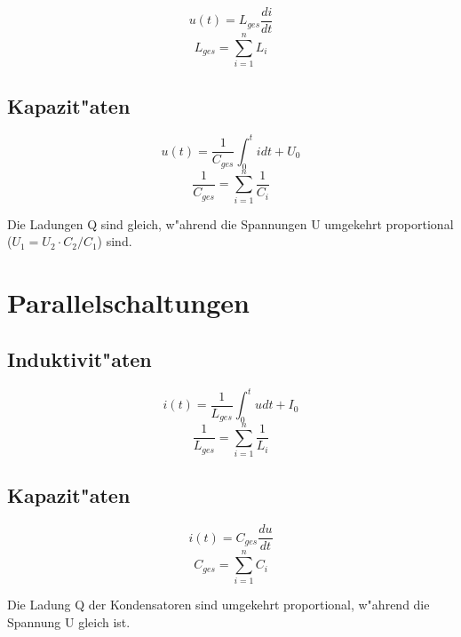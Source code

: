 \documentclass[german, 10pt, a4paper, headsepline]{scrreprt}
\theoremstyle{remark}
\begin{document}
\begin{displaymath}
	u(t)=L_{ges}\frac{di}{dt}
\end{displaymath}
\begin{displaymath}
	L_{ges}=\sum^n_{i=1}L_i
\end{displaymath}

\subsection{Kapazit"aten}

\begin{displaymath}
	u(t)=\frac{1}{C_{ges}}\int^t_0 idt + U_0
\end{displaymath}
\begin{displaymath}
	\frac{1}{C_{ges}}=\sum^n_{i=1}\frac{1}{C_i}
\end{displaymath}

Die Ladungen Q sind gleich, w"ahrend die Spannungen U umgekehrt proportional ($U_1 = U_2 \cdotp C_2/C_1$) sind.

\section{Parallelschaltungen}

\subsection{Induktivit"aten}

\begin{displaymath}
	i(t)=\frac{1}{L_{ges}}\int^t_0 u dt + I_0
\end{displaymath}
\begin{displaymath}
	\frac{1}{L_{ges}}=\sum^n_{i=1}\frac{1}{L_i}
\end{displaymath}

\subsection{Kapazit"aten}

\begin{displaymath}
	i(t)=C_{ges}\frac{du}{dt}
\end{displaymath}
\begin{displaymath}
	C_{ges}=\sum^n_{i=1}C_i
\end{displaymath}

Die Ladung Q der Kondensatoren sind umgekehrt proportional, w"ahrend die Spannung U gleich ist.
\end{document}
